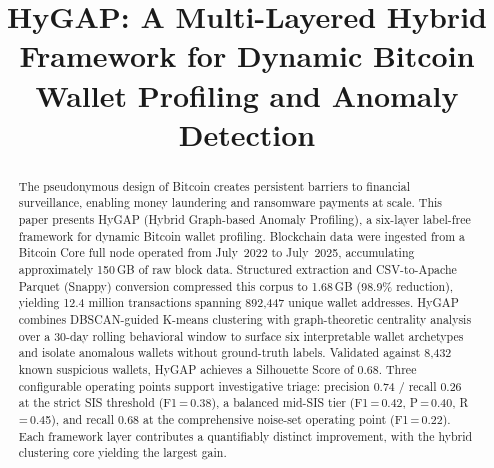 \documentclass[conference]{IEEEtran}
\begin{document}
\title{HyGAP: A Multi-Layered Hybrid Framework for Dynamic Bitcoin
       Wallet Profiling and Anomaly Detection}

\author{
\and
{}
}

\maketitle

\begin{abstract}
The pseudonymous design of Bitcoin creates persistent barriers to
financial surveillance, enabling money laundering and ransomware
payments at scale. This paper presents HyGAP (Hybrid Graph-based
Anomaly Profiling), a six-layer label-free framework for dynamic
Bitcoin wallet profiling. Blockchain data were ingested from a
Bitcoin Core full node operated from July~2022 to July~2025,
accumulating approximately 150\,GB of raw block data. Structured
extraction and CSV-to-Apache Parquet (Snappy) conversion compressed
this corpus to 1.68\,GB (98.9\% reduction), yielding 12.4 million
transactions spanning 892{,}447 unique wallet addresses. HyGAP combines DBSCAN-guided
K-means clustering with graph-theoretic centrality analysis over
a 30-day rolling behavioral window to surface six interpretable
wallet archetypes and isolate anomalous wallets without
ground-truth labels. Validated against 8{,}432 known suspicious
wallets, HyGAP achieves a Silhouette Score of 0.68. Three
configurable operating points support investigative triage:
precision 0.74 / recall 0.26 at the strict SIS threshold
(F1\,=\,0.38), a balanced mid-SIS tier (F1\,=\,0.42,
P\,=\,0.40, R\,=\,0.45), and recall 0.68 at the comprehensive
noise-set operating point (F1\,=\,0.22). Each framework layer contributes a quantifiably
distinct improvement, with the hybrid clustering core yielding
the largest gain.
\end{abstract}
\end{document}
